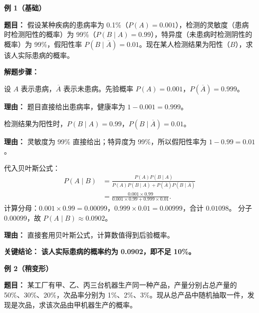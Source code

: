 \begin{examplebox}
	\textbf{\textcolor{CExample}{例 1（基础）}}

	\textbf{\textcolor{CExample}{题目：}}
	假设某种疾病的患病率为 0.1\%（$P(A)=0.001$），检测的灵敏度（患病时检测阳性的概率）为 99\%（$P(B\mid A)=0.99$），特异度（未患病时检测阴性的概率）为 99\%，假阳性率 $P(B\mid \overline{A})=0.01$。现在某人检测结果为阳性（$B$），求该人实际患病的概率。

	\textbf{\textcolor{CExample}{解题步骤：}}
	\begin{description}[style=nextline, leftmargin=2.8em, labelsep=0.5em, itemsep=0.45em]
		\item[\textbf{第一步（设定事件）：}] 设 $A$ 表示患病，$\overline{A}$ 表示未患病。先验概率 $P(A)=0.001$，$P(\overline{A})=0.999$。
			\par\textbf{理由：} 题目直接给出患病率，健康率为 $1-0.001=0.999$。
		\item[\textbf{第二步（提取似然）：}] 检测结果为阳性时，$P(B\mid A)=0.99$，$P(B\mid \overline{A})=0.01$。
			\par\textbf{理由：} 灵敏度为 99\% 直接给出；特异度为 99\%，所以假阳性率为 $1-0.99=0.01$。
		\item[\textbf{第三步（公式计算）：}] 代入贝叶斯公式：
			\[
				\begin{aligned}
					P(A\mid B) &= \frac{P(A)P(B\mid A)}{P(A)P(B\mid A)+P(\overline{A})P(B\mid \overline{A})} \\
					&= \frac{0.001\times0.99}{0.001\times0.99+0.999\times0.01}.
			\end{aligned}
			\]
			计算分母：$0.001\times0.99=0.00099$，$0.999\times0.01=0.00999$，合计 $0.01098$。
			分子 $0.00099$，故 $P(A\mid B)\approx 0.0902$。
			\par\textbf{理由：} 直接套用贝叶斯公式，计算数值得到后验概率。
	\end{description}

	\textbf{\textcolor{CExample}{关键结论：}}
	\textbf{该人实际患病的概率约为 0.0902，即不足 10\%。}

	\medskip
	\textbf{\textcolor{CExample}{例 2（稍变形）}}

	\textbf{\textcolor{CExample}{题目：}}
	某工厂有甲、乙、丙三台机器生产同一种产品，产量分别占总产量的 50\%、30\%、20\%，次品率分别为 1\%、2\%、3\%。现从总产品中随机抽取一件，发现是次品，求该次品由甲机器生产的概率。


\end{examplebox}
